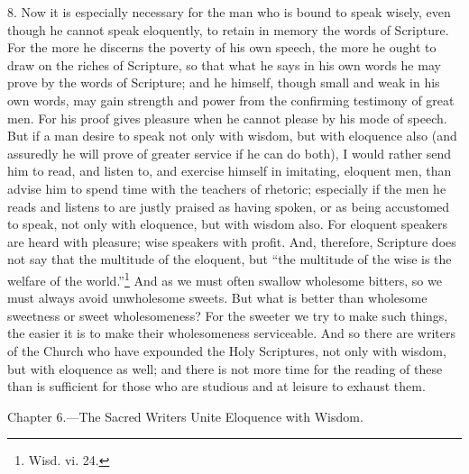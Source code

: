 8. Now it is especially necessary for the man who is bound to speak wisely, even though he cannot speak eloquently, to retain in memory the words of Scripture. For the more he discerns the poverty of his own speech, the more he ought to draw on the riches of Scripture, so that what he says in his own words he may prove by the words of Scripture; and he himself, though small and weak in his own words, may gain strength and power from the confirming testimony of great men. For his proof gives pleasure when he cannot please by his mode of speech. But if a man desire to speak not only with wisdom, but with eloquence also (and assuredly he will prove of greater service if  he can do both), I would rather send him to read, and listen to, and exercise himself in imitating, eloquent men, than advise him to spend time with the teachers of rhetoric; especially if the men he reads and listens to are justly praised as having spoken, or as being accustomed to speak, not only with eloquence, but with wisdom also. For eloquent speakers are heard with pleasure; wise speakers with profit. And, therefore, Scripture does not say that the multitude of the eloquent, but “the multitude of the wise is the welfare of the world.”\footnote{Wisd. vi. 24.} And as we must often swallow wholesome bitters, so we must always avoid unwholesome sweets. But what is better than wholesome sweetness or sweet wholesomeness? For the sweeter we try to make such things, the easier it is to make their wholesomeness serviceable. And so there are writers of the Church who have expounded the Holy Scriptures, not only with wisdom, but with eloquence as well; and there is not more time for the reading of these than is sufficient for those who are studious and at leisure to exhaust them.


Chapter 6.—The Sacred Writers Unite Eloquence with Wisdom.

